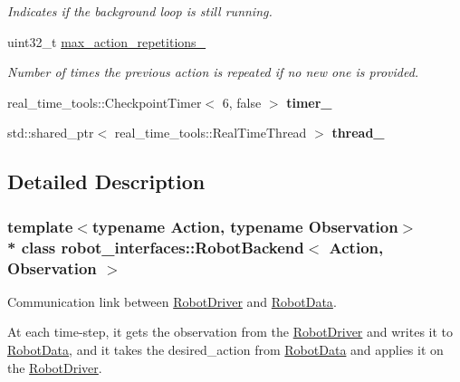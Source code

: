 \begin{DoxyCompactItemize}
\begin{DoxyCompactList}\small\item\em Indicates if the background loop is still running. \end{DoxyCompactList}\item 
uint32\+\_\+t \hyperlink{classrobot__interfaces_1_1RobotBackend_ae40ecdc44212f79f96d63a84f7b8a6e8}{max\+\_\+action\+\_\+repetitions\+\_\+}\hypertarget{classrobot__interfaces_1_1RobotBackend_ae40ecdc44212f79f96d63a84f7b8a6e8}{}\label{classrobot__interfaces_1_1RobotBackend_ae40ecdc44212f79f96d63a84f7b8a6e8}

\begin{DoxyCompactList}\small\item\em Number of times the previous action is repeated if no new one is provided. \end{DoxyCompactList}\item 
real\+\_\+time\+\_\+tools\+::\+Checkpoint\+Timer$<$ 6, false $>$ {\bfseries timer\+\_\+}\hypertarget{classrobot__interfaces_1_1RobotBackend_a69c9b7f07651484d1677121f72832482}{}\label{classrobot__interfaces_1_1RobotBackend_a69c9b7f07651484d1677121f72832482}

\item 
std\+::shared\+\_\+ptr$<$ real\+\_\+time\+\_\+tools\+::\+Real\+Time\+Thread $>$ {\bfseries thread\+\_\+}\hypertarget{classrobot__interfaces_1_1RobotBackend_afcf4f2443b7f3000cece9b0851284717}{}\label{classrobot__interfaces_1_1RobotBackend_afcf4f2443b7f3000cece9b0851284717}

\end{DoxyCompactItemize}


\subsection{Detailed Description}
\subsubsection*{template$<$typename Action, typename Observation$>$\\*
class robot\+\_\+interfaces\+::\+Robot\+Backend$<$ Action, Observation $>$}

Communication link between \hyperlink{classrobot__interfaces_1_1RobotDriver}{Robot\+Driver} and \hyperlink{classrobot__interfaces_1_1RobotData}{Robot\+Data}. 

At each time-\/step, it gets the observation from the \hyperlink{classrobot__interfaces_1_1RobotDriver}{Robot\+Driver} and writes it to \hyperlink{classrobot__interfaces_1_1RobotData}{Robot\+Data}, and it takes the desired\+\_\+action from \hyperlink{classrobot__interfaces_1_1RobotData}{Robot\+Data} and applies it on the \hyperlink{classrobot__interfaces_1_1RobotDriver}{Robot\+Driver}.



